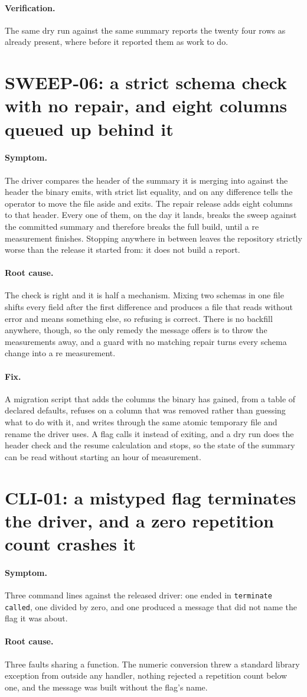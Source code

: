 \documentclass[11pt,a4paper]{report}
\newcommand{\symptom}[1]{\paragraph{Symptom.}#1}
\newcommand{\rootcause}[1]{\paragraph{Root cause.}#1}
\newcommand{\fix}[1]{\paragraph{Fix.}#1}
\newcommand{\verification}[1]{\paragraph{Verification.}#1}
\begin{document}
\verification{The same dry run against the same summary reports the twenty four
rows as already present, where before it reported them as work to do.}

\section{SWEEP-06: a strict schema check with no repair, and eight columns queued up behind it}

\symptom{The driver compares the header of the summary it is merging into against
the header the binary emits, with strict list equality, and on any difference
tells the operator to move the file aside and exits. The repair release adds
eight columns to that header. Every one of them, on the day it lands, breaks the
sweep against the committed summary and therefore breaks the full build, until a
re measurement finishes. Stopping anywhere in between leaves the repository
strictly worse than the release it started from: it does not build a report.}

\rootcause{The check is right and it is half a mechanism. Mixing two schemas in
one file shifts every field after the first difference and produces a file that
reads without error and means something else, so refusing is correct. There is no
backfill anywhere, though, so the only remedy the message offers is to throw the
measurements away, and a guard with no matching repair turns every schema change
into a re measurement.}

\fix{A migration script that adds the columns the binary has gained, from a table
of declared defaults, refuses on a column that was removed rather than guessing
what to do with it, and writes through the same atomic temporary file and rename
the driver uses. A flag calls it instead of exiting, and a dry run does the header
check and the resume calculation and stops, so the state of the summary can be
read without starting an hour of measurement.}

\section{CLI-01: a mistyped flag terminates the driver, and a zero repetition count crashes it}

\symptom{Three command lines against the released driver: one ended in
\texttt{terminate called}, one divided by zero, and one produced a message that
did not name the flag it was about.}

\rootcause{Three faults sharing a function. The numeric conversion threw a
standard library exception from outside any handler, nothing rejected a
repetition count below one, and the message was built without the flag's name.}
\end{document}
